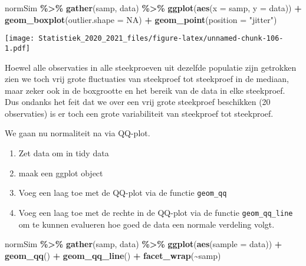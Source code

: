 \documentclass[
  12pt,dutch,coursenotes]{book}
\newenvironment{Shaded}{\begin{snugshade}}{\end{snugshade}}
\newcommand{\DataTypeTok}[1]{\textcolor[rgb]{0.13,0.29,0.53}{#1}}
\newcommand{\KeywordTok}[1]{\textcolor[rgb]{0.13,0.29,0.53}{\textbf{#1}}}
\newcommand{\NormalTok}[1]{#1}
\newcommand{\OperatorTok}[1]{\textcolor[rgb]{0.81,0.36,0.00}{\textbf{#1}}}
\newcommand{\OtherTok}[1]{\textcolor[rgb]{0.56,0.35,0.01}{#1}}
\newcommand{\StringTok}[1]{\textcolor[rgb]{0.31,0.60,0.02}{#1}}
\providecommand{\tightlist}{%
  \setlength{\itemsep}{0pt}\setlength{\parskip}{0pt}}
\theoremstyle{definition}
\theoremstyle{definition}
\theoremstyle{definition}
\theoremstyle{remark}
\begin{document}
\begin{Shaded}
\begin{Highlighting}[]
\NormalTok{normSim }\OperatorTok{\%\textgreater{}\%}\StringTok{ }\KeywordTok{gather}\NormalTok{(samp, data) }\OperatorTok{\%\textgreater{}\%}\StringTok{ }\KeywordTok{ggplot}\NormalTok{(}\KeywordTok{aes}\NormalTok{(}\DataTypeTok{x =}\NormalTok{ samp, }
    \DataTypeTok{y =}\NormalTok{ data)) }\OperatorTok{+}\StringTok{ }\KeywordTok{geom\_boxplot}\NormalTok{(}\DataTypeTok{outlier.shape =} \OtherTok{NA}\NormalTok{) }\OperatorTok{+}\StringTok{ }
\StringTok{    }\KeywordTok{geom\_point}\NormalTok{(}\DataTypeTok{position =} \StringTok{"jitter"}\NormalTok{)}
\end{Highlighting}
\end{Shaded}

\texttt{[image: Statistiek\_2020\_2021\_files/figure-latex/unnamed-chunk-106-1.pdf]}

Hoewel alle observaties in alle steekproeven uit dezelfde populatie zijn getrokken zien we toch vrij grote fluctuaties van steekproef tot steekproef in de mediaan, maar zeker ook in de boxgrootte en het bereik van de data in elke steekproef. Dus ondanks het feit dat we over een vrij grote steekproef beschikken (20 observaties) is er toch een grote variabiliteit van steekproef tot steekproef.

We gaan nu normaliteit na via QQ-plot.

\begin{enumerate}
\def\labelenumi{\arabic{enumi}.}
\tightlist
\item
  Zet data om in tidy data
\item
  maak een ggplot object
\item
  Voeg een laag toe met de QQ-plot via de functie \texttt{geom\_qq}
\item
  Voeg een laag toe met de rechte in de QQ-plot via de functie \texttt{geom\_qq\_line} om te kunnen evalueren hoe goed de data een normale verdeling volgt.
\end{enumerate}

\begin{Shaded}
\begin{Highlighting}[]
\NormalTok{normSim }\OperatorTok{\%\textgreater{}\%}\StringTok{ }\KeywordTok{gather}\NormalTok{(samp, data) }\OperatorTok{\%\textgreater{}\%}\StringTok{ }\KeywordTok{ggplot}\NormalTok{(}\KeywordTok{aes}\NormalTok{(}\DataTypeTok{sample =}\NormalTok{ data)) }\OperatorTok{+}\StringTok{ }
\StringTok{    }\KeywordTok{geom\_qq}\NormalTok{() }\OperatorTok{+}\StringTok{ }\KeywordTok{geom\_qq\_line}\NormalTok{() }\OperatorTok{+}\StringTok{ }\KeywordTok{facet\_wrap}\NormalTok{(}\OperatorTok{\textasciitilde{}}\NormalTok{samp)}
\end{Highlighting}
\end{Shaded}
\end{document}
